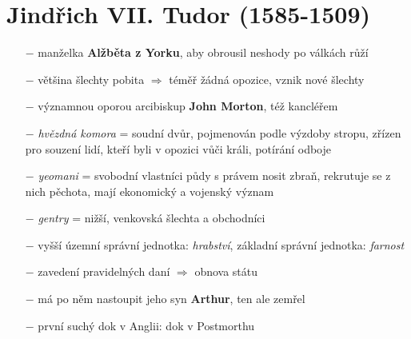 \documentclass{article}
\begin{document}
\section*{Jindřich VII. Tudor (1585-1509)}
\begin{itemize}
    \vspace{-0.5em}
    \setlength\itemsep{0.15em}
    \item[$-$] manželka \textbf{Alžběta z Yorku}, aby obrousil neshody po válkách růží
    \item[$-$] většina šlechty pobita $\Rightarrow$ téměř žádná opozice, vznik nové šlechty
    \item[$-$] významnou oporou arcibiskup \textbf{John Morton}, též kancléřem
    \item[$-$] \textit{hvězdná komora} = soudní dvůr, pojmenován podle výzdoby stropu, zřízen pro souzení lidí, kteří byli v opozici vůči králi, potírání odboje
    \item[$-$]  \textit{yeomani} = svobodní vlastníci půdy s právem nosit zbraň, rekrutuje se z nich pěchota, mají ekonomický a vojenský význam
    \item[$-$] \textit{gentry} = nižší, venkovská šlechta a obchodníci
    \item[$-$] vyšší územní správní jednotka: \textit{hrabství}, základní správní jednotka: \textit{farnost}
    \item[$-$] zavedení pravidelných daní $\Rightarrow$ obnova státu
    \item[$-$] má po něm nastoupit jeho syn \textbf{Arthur}, ten ale zemřel
    \item[$-$] první suchý dok v Anglii: dok v Postmorthu
\end{itemize}
\end{document}
